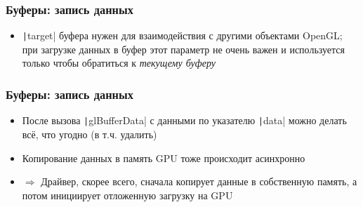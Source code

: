 \documentclass[10pt]{beamer}
\begin{document}
\begin{frame}[fragile]
\frametitle{Буферы: запись данных}
\begin{itemize}
\item \texttt|target| буфера нужен для взаимодействия с другими объектами OpenGL; при загрузке данных в буфер этот параметр не очень важен и используется только чтобы обратиться к \textit{текущему буферу}
\end{itemize}
\end{frame}

\begin{frame}[fragile]
\frametitle{Буферы: запись данных}
\begin{itemize}
\item После вызова \texttt|glBufferData| с данными по указателю \texttt|data| можно делать всё, что угодно (в т.ч. удалить)
\pause
\item Копирование данных в память GPU тоже происходит асинхронно
\pause
\item \begin{math}\Longrightarrow\end{math} Драйвер, скорее всего, сначала копирует данные в собственную память, а потом инициирует отложенную загрузку на GPU
\end{itemize}
\end{frame}
\end{document}

